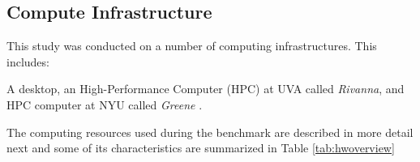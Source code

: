 \documentclass[sigplan,screen]{acmart}
\begin{document}

\subsection{Compute Infrastructure}
\label{sec:hw}

This study was conducted on a number of computing infrastructures. This includes:


A desktop, an High-Performance Computer (HPC)  at UVA called {\em Rivanna}, and HPC computer at NYU called {\em Greene} \cite{www-greene-hw,www-greene}.

The computing resources used during the benchmark are described   in more detail next and some of its characteristics are summarized in Table \ref{tab:hwoverview}
\end{document}
